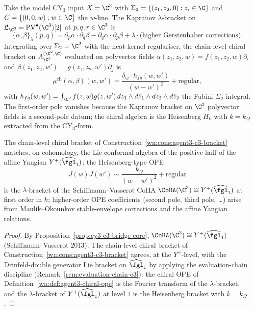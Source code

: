 \begin{construction}[Chain-level chiral bracket for $\cC=\C^3$, $\Sigma_2=\C^2$, $C=\C$]
\label{wn:cons:agent3-c3-bracket}
Take the model CY$_3$ input $X=\C^3$ with $\Sigma_2=\{(z_1,z_2,0):z_i\in\C\}$ and $C=\{(0,0,w):w\in\C\}$ the $w$-line. The Kapranov $\lambda$-bracket on $\mathfrak{L}_{\C^3}=\mathrm{PV}^\bullet(\C^3)[2]$ at $p,q,r\in\C^3$ is
\[
 \{\alpha,\beta\}_\lambda(p,q)
 =
 \partial_p\alpha\cdot\partial_q\beta
 -\partial_q\alpha\cdot\partial_p\beta
 +\lambda\cdot\text{(higher Gerstenhaber corrections)}.
\]
Integrating over $\Sigma_2=\C^2$ with the heat-kernel regulariser, the chain-level chiral bracket on $A^{(\C^2,\C)}_{\C^3}$ evaluated on polyvector fields $\alpha(z_1,z_2,w)=f(z_1,z_2,w)\partial_i$ and $\beta(z_1,z_2,w')=g(z_1,z_2,w')\partial_j$ is
\[
 \mu^{\mathrm{ch}}(\alpha,\beta)(w,w')
 =
 \frac{\delta_{ij}\cdot h_{fg}(w,w')}{(w-w')^2}
 +\text{regular},
\]
with $h_{fg}(w,w')=\int_{\C^2}f(z,w)g(z,w')\,dz_1\wedge d\bar z_1\wedge dz_2\wedge d\bar z_2$ the Fubini $\Sigma_2$-integral. The first-order pole vanishes because the Kapranov bracket on $\C^3$ polyvector fields is a second-pole datum; the chiral algebra is the Heisenberg $H_k$ with $k=k_{\Omega}$ extracted from the CY$_3$-form.
\end{construction}

\begin{proposition}
\label{wn:prop:agent3-c3-identifies-Yplus}
\ClaimStatusProvedElsewhere{}
The chain-level chiral bracket of Construction~\ref{wn:cons:agent3-c3-bracket} matches, on cohomology, the Lie conformal algebra of the positive half of the affine Yangian $Y^+(\widehat{\fgl}_1)$: the Heisenberg-type OPE
\[
 J(w)J(w')\sim\frac{k_\Omega}{(w-w')^2}+\text{regular}
\]
is the $\lambda$-bracket of the Schiffmann--Vasserot CoHA $\CoHA(\C^3)\cong Y^+(\widehat{\fgl}_1)$ at first order in $\hbar$; higher-order OPE coefficients (second pole, third pole, \ldots) arise from Maulik--Okounkov stable-envelope corrections and the affine Yangian relations.
\end{proposition}

\begin{proof}
By Proposition~\ref{prop:cy3-c3-bridge-core}, $\CoHA(\C^3)\cong Y^+(\widehat{\fgl}_1)$ (Schiffmann--Vasserot $2013$). The chain-level chiral bracket of Construction~\ref{wn:cons:agent3-c3-bracket} agrees, at the $Y^+$-level, with the Drinfeld-double generator Lie bracket on $\widehat{\fgl}_1$ by applying the evaluation-chain discipline (Remark~\ref{rem:evaluation-chain-c3}): the chiral OPE of Definition~\ref{wn:def:agent3-chiral-ope} is the Fourier transform of the $\lambda$-bracket, and the $\lambda$-bracket of $Y^+(\widehat{\fgl}_1)$ at level $1$ is the Heisenberg bracket with $k=k_\Omega$.
\end{proof}


